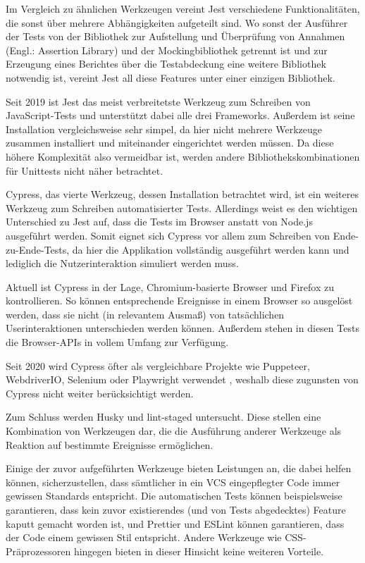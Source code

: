 Im Vergleich zu ähnlichen Werkzeugen vereint Jest verschiedene Funktionalitäten, die sonst über mehrere Abhängigkeiten aufgeteilt sind. Wo sonst der Ausführer der Tests von der Bibliothek zur Aufstellung und Überprüfung von Annahmen (Engl.: \glqq Assertion Library\grqq) und der Mockingbibliothek getrennt ist und zur Erzeugung eines Berichtes über die Testabdeckung eine weitere Bibliothek notwendig ist, vereint Jest all diese Features unter einer einzigen Bibliothek.

Seit 2019 ist Jest das meist verbreitetste Werkzeug zum Schreiben von JavaScript-Tests \cite{stateofjs} und unterstützt dabei alle drei Frameworks. Außerdem ist seine Installation vergleichsweise sehr simpel, da hier nicht mehrere Werkzeuge zusammen installiert und miteinander eingerichtet werden müssen. Da diese höhere Komplexität also vermeidbar ist, werden andere Bibliothekskombinationen für Unittests nicht näher betrachtet.

Cypress, das vierte Werkzeug, dessen Installation betrachtet wird, ist ein weiteres Werkzeug zum Schreiben automatisierter Tests. Allerdings weist es den wichtigen Unterschied zu Jest auf, dass die Tests im Browser anstatt von Node.js ausgeführt werden. Somit eignet sich Cypress vor allem zum Schreiben von Ende-zu-Ende-Tests, da hier die Applikation vollständig ausgeführt werden kann und lediglich die Nutzerinteraktion simuliert werden muss.

Aktuell ist Cypress in der Lage, Chromium-basierte Browser und Firefox zu kontrollieren. So können entsprechende Ereignisse in einem Browser so ausgelöst werden, dass sie nicht (in relevantem Ausmaß) von tatsächlichen Userinteraktionen unterschieden werden können. Außerdem stehen in diesen Tests die Browser-APIs in vollem Umfang zur Verfügung.

Seit 2020 wird Cypress öfter als vergleichbare Projekte wie Puppeteer, WebdriverIO, Selenium oder Playwright verwendet \cite{stateofjs}, weshalb diese zugunsten von Cypress nicht weiter berücksichtigt werden.

Zum Schluss werden Husky und lint-staged untersucht. Diese stellen eine Kombination von Werkzeugen dar, die die Ausführung anderer Werkzeuge als Reaktion auf bestimmte Ereignisse ermöglichen.

Einige der zuvor aufgeführten Werkzeuge bieten Leistungen an, die dabei helfen können, sicherzustellen, dass sämtlicher in ein \gls{VCS} eingepflegter Code immer gewissen Standards entspricht. Die automatischen Tests können beispielsweise garantieren, dass kein zuvor existierendes (und von Tests abgedecktes) Feature kaputt gemacht worden ist, und Prettier und ESLint können garantieren, dass der Code einem gewissen Stil entspricht. Andere Werkzeuge wie CSS-Präprozessoren hingegen bieten in dieser Hinsicht keine weiteren Vorteile.

